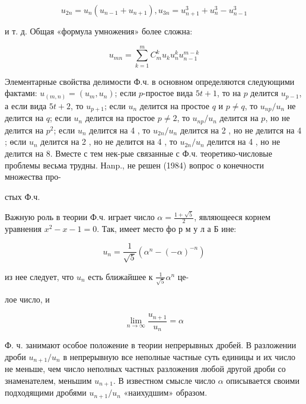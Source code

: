 \documentclass[10pt]{article}
\begin{document}
\[

u_{2 n}=u_{n}\left(u_{n-1}+u_{n+1}\right), u_{3 n}=u_{n+1}^{3}+u_{n}^{3}-u_{n-1}^{3}

\]



и т. д. Общая «формула умножения» более сложна:



\[

u_{m n}=\sum_{k=1}^{m} C_{m}^{k} u_{k} u_{n}^{k} u_{n-1}^{m-k}

\]



Элементарные свойства делимости Ф.ч. в основном определяются следующими фактами: $u_{(m, n)}=\left(u_{m}, u_{n}\right)$; если $p$-простое вида $5 t+1$, то на $p$ делится $u_{p-1}$, а если вида $5 t+2$, то $u_{p+1}$; если $u_{n}$ делится на простое $q$ и $p \neq q$, то $u_{n p} / u_{n}$ не делится на $q$; если $u_{n}$ делится на простое $p \neq 2$, то $u_{n p} / u_{n}$ делится на $p$, но не делится на $p^{2}$; если $u_{n}$ делится на 4 , то $u_{2 n} / u_{n}$ делится на 2 , но не делится на 4 ; өсли $u_{n}$ делится на 2 , но не делится на 4 , то $u_{2 n} / u_{n}$ делится на 4 , но не делится на 8. Вместе с тем нек-рые связанные с Ф.ч. теоретико-числовые проблемы весьма трудны. Нanp., не решен (1984) вопрос о конечности множества про-



стых Ф.ч.

Важную роль в теории Ф.ч. играет число $\alpha=\frac{1+\sqrt{5}}{2}$, являющееся корнем уравнения $x^{2}-x-1=0$. Так, имеет место фо р м у л а Б ине:



\[

u_{n}=\frac{1}{\sqrt{5}}\left(\alpha^{n}-(-\alpha)^{-n}\right)

\]



из нее следует, что $u_{n}$ есть ближайшее к $\frac{1}{\sqrt{5}} \alpha^{n}$ це-

лое число, и



\[

\lim _{n \rightarrow \infty} \frac{u_{n+1}}{u_{n}}=\alpha

\]



Ф. ч. занимают особое положение в теории непрерывных дробей. В разложении дроби $u_{n+1} / u_{n}$ в непрерывную все неполные частные суть единицы и их число не меньше, чем число неполных частных разложения любой другой дроби со знаменателем, меньшим $u_{n+1}$. В известном смысле число $\alpha$ описывается своими подходящими дробями $u_{n+1} / u_{n}$ «наихудшим» образом.
\end{document}
